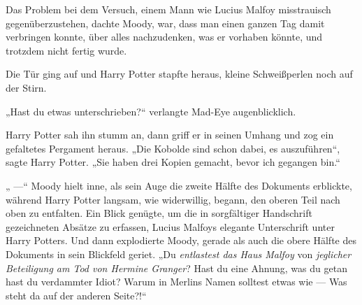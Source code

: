 Das Problem bei dem Versuch, einem Mann wie Lucius Malfoy misstrauisch gegenüberzustehen, dachte Moody, war, dass man einen ganzen Tag damit verbringen konnte, über alles nachzudenken, was er vorhaben könnte, und trotzdem nicht fertig wurde.

Die Tür ging auf und Harry Potter stapfte heraus, kleine Schweißperlen noch auf der Stirn.

„Hast du etwas unterschrieben?“ verlangte Mad-Eye augenblicklich.

Harry Potter sah ihn stumm an, dann griff er in seinen Umhang und zog ein gefaltetes Pergament heraus.
„Die Kobolde sind schon dabei, es auszuführen“, sagte Harry Potter.
„Sie haben drei Kopien gemacht, bevor ich gegangen bin.“

„ —“
Moody hielt inne, als sein Auge die zweite Hälfte des Dokuments erblickte, während Harry Potter langsam, wie widerwillig, begann, den oberen Teil nach oben zu entfalten. Ein Blick genügte, um die in sorgfältiger Handschrift gezeichneten Absätze zu erfassen, Lucius Malfoys elegante Unterschrift unter Harry Potters. Und dann explodierte Moody, gerade als auch die obere Hälfte des Dokuments in sein Blickfeld geriet.
„Du \emph{entlastest das Haus Malfoy} von \emph{jeglicher Beteiligung am Tod von Hermine Granger}? Hast du eine Ahnung, was du getan hast du verdammter Idiot? Warum in Merlins Namen solltest etwas wie — Was steht da auf der anderen Seite?!“

